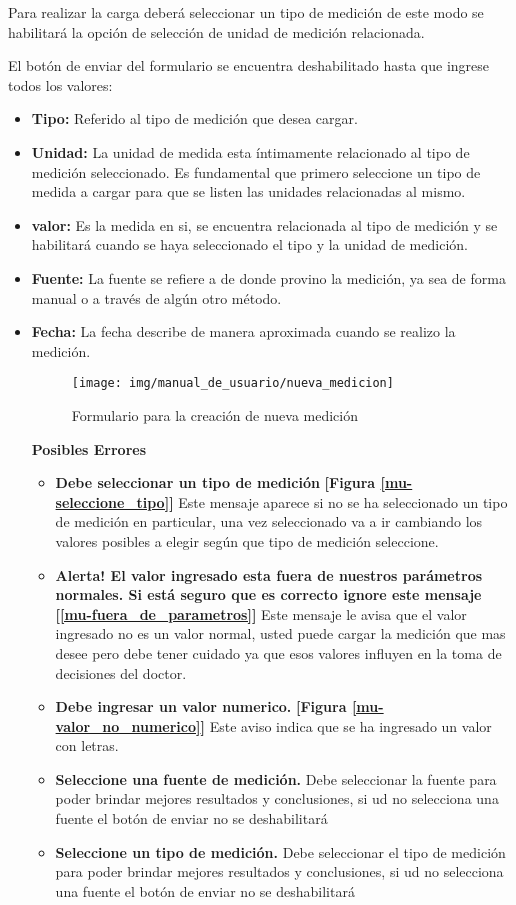 Para realizar la carga deberá seleccionar un tipo de medición de este modo se habilitará la opción de selección de unidad de medición relacionada.

El botón de enviar del formulario se encuentra deshabilitado hasta que ingrese todos los valores:

\begin{itemize}
		\item \textbf{Tipo: } Referido al tipo de medición que desea cargar.
		
			\item \textbf{Unidad: } La unidad de medida esta íntimamente relacionado al tipo de medición seleccionado. Es fundamental que primero seleccione un tipo de medida a cargar para que se listen las unidades relacionadas al mismo.
			
	\item \textbf{valor:} Es la medida en si, se encuentra relacionada al tipo de medición y se habilitará cuando se haya seleccionado el tipo y la unidad de medición.
	\item \textbf{Fuente:} La fuente se refiere a de donde provino la medición, ya sea de forma manual o a través de algún otro método.
	\item \textbf{Fecha:} La fecha describe de manera aproximada cuando se realizo la medición.
    \begin{figure}
    	\centering
    	\texttt{[image: img/manual\_de\_usuario/nueva\_medicion]}
    	\caption{Formulario para la creación de nueva medición}
    	\label{mu-nueva_medicion}
    \end{figure}
    
    
\textbf{Posibles Errores}
\begin{itemize}
	\item \textbf{Debe seleccionar un tipo de medición} \textbf{[Figura \ref{mu-seleccione_tipo}]} Este mensaje aparece si no se ha seleccionado un tipo de medición en particular, una vez seleccionado va a ir cambiando los valores posibles a elegir según que tipo de medición seleccione.
	\item \textbf{Alerta! El valor ingresado esta fuera de nuestros parámetros normales. Si está seguro que es correcto ignore este mensaje} \textbf{[\ref{mu-fuera_de_parametros}]} Este mensaje le avisa que el valor ingresado no es un valor normal, usted puede cargar la medición que mas desee pero debe tener cuidado ya que esos valores influyen en la toma de decisiones del doctor.
	\item \textbf{Debe ingresar un valor numerico.} \textbf{[Figura \ref{mu-valor_no_numerico}]} Este aviso indica que se ha ingresado un valor con letras.
	\item \textbf{Seleccione una fuente de medición.} Debe seleccionar la fuente para poder brindar mejores resultados y conclusiones, si ud no selecciona una fuente el botón de enviar no se deshabilitará
	\item \textbf{Seleccione un tipo de medición.} Debe seleccionar el tipo de medición para poder brindar mejores resultados y conclusiones, si ud no selecciona una fuente el botón de enviar no se deshabilitará
\end{itemize}
\end{itemize}

